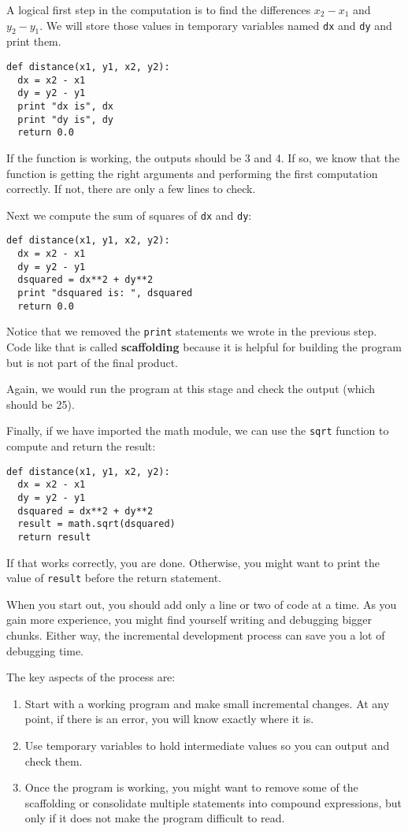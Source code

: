 A logical first step in the computation is to find the differences
$x_2 - x_1$ and $y_2 - y_1$.  We will store those values in
temporary variables named {\tt dx} and {\tt dy} and print them.

\beforeverb
\begin{verbatim}
def distance(x1, y1, x2, y2):
  dx = x2 - x1
  dy = y2 - y1
  print "dx is", dx
  print "dy is", dy
  return 0.0
\end{verbatim}
\afterverb
%
If the function is working, the outputs should be 3 and 4.  If so,
we know that the function is getting the right arguments and performing
the first computation correctly.  If not, there are only a few lines
to check.

Next we compute the sum of squares of {\tt dx} and {\tt dy}:

\beforeverb
\begin{verbatim}
def distance(x1, y1, x2, y2):
  dx = x2 - x1
  dy = y2 - y1
  dsquared = dx**2 + dy**2
  print "dsquared is: ", dsquared
  return 0.0
\end{verbatim}
\afterverb
%
Notice that we removed the {\tt print} statements we wrote in the previous
step.  Code like that is called {\bf scaffolding} because it is
helpful for building the program but is not part of the final product.

Again, we would run the program at this stage and check the output
(which should be 25).

Finally, if we have imported the math module, we can use the
{\tt sqrt} function to compute and return the result:

\beforeverb
\begin{verbatim}
def distance(x1, y1, x2, y2):
  dx = x2 - x1
  dy = y2 - y1
  dsquared = dx**2 + dy**2
  result = math.sqrt(dsquared)
  return result
\end{verbatim}
\afterverb
%
If that works correctly, you are done.  Otherwise, you might
want to print the value of {\tt result} before the return
statement.

When you start out, you should add only a line or two of code
at a time.
As you gain more experience, you might find yourself
writing and debugging bigger chunks.  Either way,
the incremental development process can save you a lot of debugging
time.

The key aspects of the process are:

\begin{enumerate}

\item Start with a working program and make small incremental changes. 
At any point, if there is an error, you will know exactly where it is.

\item Use temporary variables to hold intermediate values so you can
output and check them.

\item Once the program is working, you might want to remove some of
the scaffolding or consolidate multiple statements into compound
expressions, but only if it does not make the program difficult to
read.

\end{enumerate}

